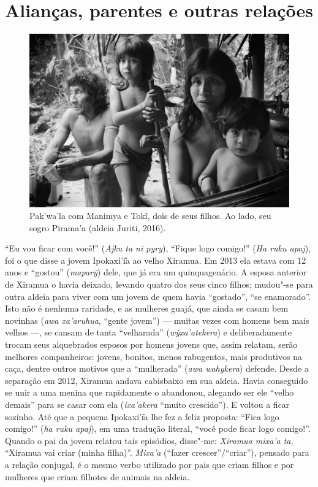 
\chapter*{Alianças, parentes e outras relações}\label{alianuxe7as-parentes-e-outras-relauxe7uxf5es}

\begin{figure}[H]
\centering
  \includegraphics[width=\textwidth]{./imgs/IMG_4928}
\caption{Pak'wa'ĩa com Manimya e Tokĩ, dois de seus filhos. Ao lado, seu sogro Pirama’a (aldeia Juriti,
2016).}
\end{figure}

\noindent ``Eu vou ficar com você!'' (\emph{Ajku ta ni pyry}), ``Fique logo comigo!''
(\emph{Ha ruku apaj}), foi o que disse a jovem Ipokaxi'ı͂a ao velho
Xiramua. Em 2013 ela estava com 12 anos e ``gostou'' (\emph{maparỹ}) dele,
que já era um quinquagenário. A esposa anterior de Xiramua o havia
deixado, levando quatro dos seus cinco filhos; mudou"-se para outra
aldeia para viver com um jovem de quem havia ``gostado'', ``se enamorado''.
Isto não é nenhuma raridade, e as mulheres guajá, que ainda se casam bem
novinhas (\emph{awa xa'aruhua}, ``gente jovem'') --- muitas vezes com homens
bem mais velhos ---, se cansam de tanta ``velharada'' (\emph{wỹxa'atekera})
e deliberadamente trocam seus alquebrados esposos por homens jovens que,
assim relatam, serão melhores companheiros: jovens, bonitos, menos
rabugentos, mais produtivos na caça, dentre outros motivos que a
``mulherada'' (\emph{awa wahykera}) defende. Desde a separação em 2012,
Xiramua andava cabisbaixo em sua aldeia. Havia conseguido se unir a uma
menina que rapidamente o abandonou, alegando ser ele ``velho demais'' para
se casar com ela (\emph{ixa'akera} ``muito crescido''). E voltou a ficar
sozinho. Até que a pequena Ipokaxi'ı͂a lhe fez a feliz proposta: ``Fica
logo comigo!'' (\emph{ha ruku apaj}), em uma tradução literal, ``você pode
ficar logo comigo!''. Quando o pai da jovem relatou tais episódios,
disse"-me: \emph{Xiramua mixa'a ta}, ``Xiramua vai criar (minha filha)''.
\emph{Mixa'a} (``fazer crescer''/``criar''), pensado para a relação
conjugal, é o mesmo verbo utilizado por pais que criam filhos e por
mulheres que criam filhotes de animais na aldeia.

